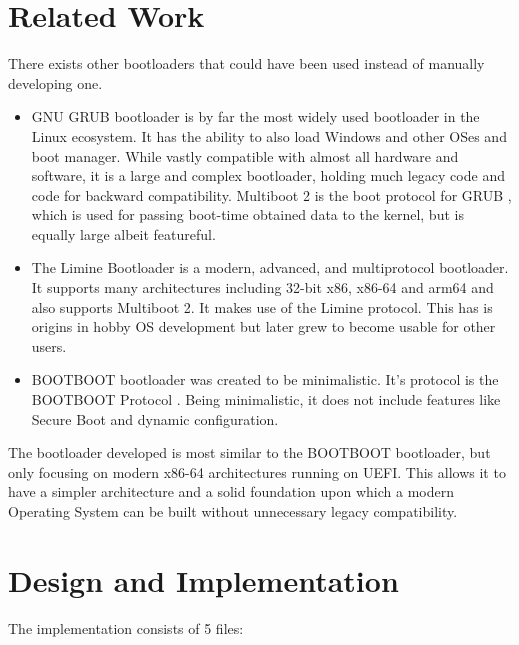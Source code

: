 \documentclass[conference]{IEEEtran}
\begin{document}
\section{Related Work}
There exists other bootloaders that could have been used instead of manually developing one.
\begin{itemize}
    \item GNU GRUB bootloader is by far the most widely used bootloader in the Linux ecosystem. \cite{grub} It has the ability to also load Windows and other OSes and boot manager. While vastly compatible with almost all hardware and software, it is a large and complex bootloader, holding much legacy code and code for backward compatibility. Multiboot 2 is the boot protocol for GRUB \cite{multiboot}, which is used for passing boot-time obtained data to the kernel, but is equally large albeit featureful.
    \item The Limine Bootloader is a modern, advanced, and multiprotocol bootloader. \cite{limine} It supports many architectures including 32-bit x86, x86-64 and arm64 and also supports Multiboot 2. It makes use of the Limine protocol. \cite{limineprotocol}
        This has is origins in hobby OS development but later grew to become usable for other users. 
    \item BOOTBOOT bootloader was created to be minimalistic. \cite{bootboot} It's protocol is the BOOTBOOT Protocol \cite{bootbootprotocol}. Being minimalistic, it does not include features like Secure Boot and dynamic configuration.
\end{itemize}

The bootloader developed is most similar to the BOOTBOOT bootloader, but only focusing on modern x86-64 architectures running on UEFI. This allows it to have a simpler architecture and a solid foundation upon which a modern Operating System can be built without unnecessary legacy compatibility.

\section{Design and Implementation}

The implementation consists of 5 files:
\end{document}
